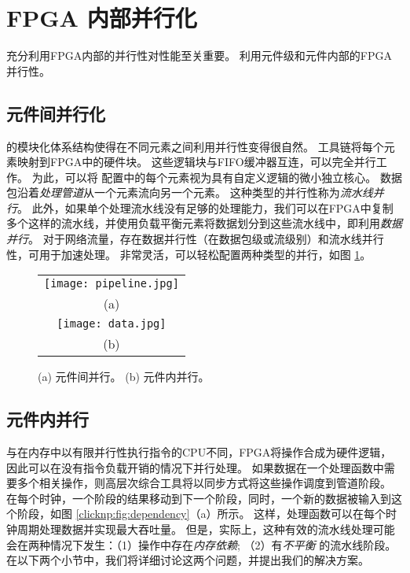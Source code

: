 \section{FPGA 内部并行化}
\label{clicknp:sec:optimization}

充分利用FPGA内部的并行性对性能至关重要。
\name 利用元件级和元件内部的FPGA并行性。

\subsection{元件间并行化}
\name 的模块化体系结构使得在不同元素之间利用并行性变得很自然。
\name 工具链将每个元素映射到FPGA中的硬件块。
这些逻辑块与FIFO缓冲器互连，可以完全并行工作。
为此，可以将 \name 配置中的每个元素视为具有自定义逻辑的微小独立核心。
数据包沿着\textit {处理管道}从一个元素流向另一个元素。
这种类型的并行性称为\textit {流水线并行}。
此外，如果单个处理流水线没有足够的处理能力，我们可以在FPGA中复制多个这样的流水线，并使用负载平衡元素将数据划分到这些流水线中，即利用\textit{数据并行}。
对于网络流量，存在数据并行性（在数据包级或流级别）和流水线并行性，可用于加速处理。
\name 非常灵活，可以轻松配置两种类型的并行，如图 \ref{clicknp:fig:element-para}。

\begin{figure}
\centering
\begin{tabular}{c}
\texttt{[image: pipeline.jpg]}\\
(a)\\
\texttt{[image: data.jpg]}\\
(b)\\
\end{tabular}
\caption{(a) 元件间并行。 (b) 元件内并行。}
\label{clicknp:fig:element-para}
\end{figure}

\subsection{元件内并行}
\label{clicknp:subsec:paral_in_elem}

与在内存中以有限并行性执行指令的CPU不同，FPGA将操作合成为硬件逻辑，因此可以在没有指令负载开销的情况下并行处理。
如果数据在一个处理函数中需要多个相关操作，则高层次综合工具将以同步方式将这些操作调度到管道阶段。
在每个时钟，一个阶段的结果移动到下一个阶段，同时，一个新的数据被输入到这个阶段，如图 \ref{clicknp:fig:dependency}（a）所示。
这样，处理函数可以在每个时钟周期处理数据并实现最大吞吐量。
但是，实际上，这种有效的流水线处理可能会在两种情况下发生：（1）操作中存在\textit {内存依赖}; （2）有\textit {不平衡} 的流水线阶段。
在以下两个小节中，我们将详细讨论这两个问题，并提出我们的解决方案。



